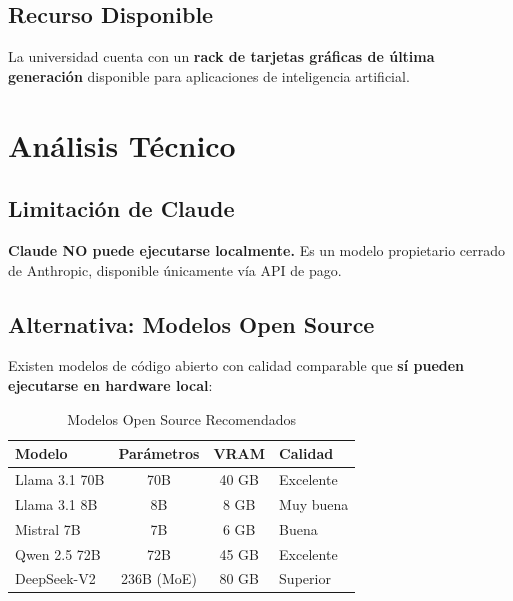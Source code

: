 \documentclass[12pt,letterpaper]{article}
\begin{document}
\subsection{Recurso Disponible}

La universidad cuenta con un \textbf{rack de tarjetas gr\'aficas de \'ultima generaci\'on} disponible para aplicaciones de inteligencia artificial.

\section{An\'alisis T\'ecnico}

\subsection{Limitaci\'on de Claude}

\begin{tcolorbox}[colback=red!10, colframe=red!70!black, title=\textbf{Importante}]
\textbf{Claude NO puede ejecutarse localmente.} Es un modelo propietario cerrado de Anthropic, disponible \'unicamente v\'ia API de pago.
\end{tcolorbox}

\subsection{Alternativa: Modelos Open Source}

Existen modelos de c\'odigo abierto con calidad comparable que \textbf{s\'i pueden ejecutarse en hardware local}:

\begin{table}[h]
\centering
\caption{Modelos Open Source Recomendados}
\begin{tabular}{@{}lccl@{}}
\toprule
\textbf{Modelo} & \textbf{Par\'ametros} & \textbf{VRAM} & \textbf{Calidad} \\
\midrule
Llama 3.1 70B & 70B & 40 GB & Excelente \\
Llama 3.1 8B & 8B & 8 GB & Muy buena \\
Mistral 7B & 7B & 6 GB & Buena \\
Qwen 2.5 72B & 72B & 45 GB & Excelente \\
DeepSeek-V2 & 236B (MoE) & 80 GB & Superior \\
\bottomrule
\end{tabular}
\end{table}
\end{document}
